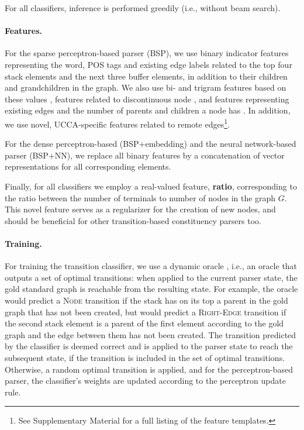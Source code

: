 \documentclass[11pt]{article}
\begin{document}
For all classifiers, inference is performed greedily (i.e., without beam search).

\paragraph{Features.}
For the sparse perceptron-based parser (BSP), we use binary indicator features representing
the word, POS tags and existing edge labels related to the top four stack elements and the next
three buffer elements, in addition to their children and grandchildren in the graph.
We also use bi- and trigram features based on these values \cite{zhang2009transition,zhu2013fast},
features related to discontinuous node \cite{maier2015discontinuous},
and features representing existing edges and the number of parents and children a node has
\cite{tokgoz2015transition}.
In addition, we use novel, UCCA-specific features related to remote edges\footnote{See
Supplementary Material for a full listing of the feature templates.}.

For the dense perceptron-based (BSP+embedding) and the neural network-based parser (BSP+NN),
we replace all binary features by a
concatenation of vector representations for all corresponding elements.

Finally, for all classifiers we employ a real-valued feature,
\textbf{ratio}, corresponding to the ratio between the number of terminals to number of nodes
in the graph $G$.
This novel feature serves as a regularizer for the creation of new nodes,
and should be beneficial for other transition-based constituency parsers too.

\paragraph{Training.}
For training the transition classifier, we use a dynamic oracle \cite{goldberg2012dynamic},
i.e., an oracle that outputs a set of optimal transitions: when
applied to the current parser state, the gold
standard graph is reachable from the resulting state.
For example, the oracle would predict a \textsc{Node} transition if the stack 
has on its top a parent in the gold graph that has not been created,
but would predict a \textsc{Right-Edge} transition if the second stack
element is a parent of the
first element according to the gold graph and the edge between them has not been created.
The transition predicted by the classifier is deemed correct
and is applied to the parser state to reach the subsequent state,
if the transition is included in the set of optimal transitions.
Otherwise, a random optimal transition is applied,
and for the perceptron-based parser, the classifier's weights are updated according
to the perceptron update rule.
\end{document}
